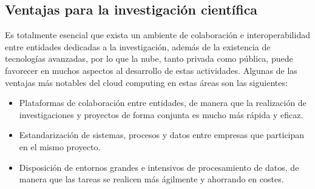\documentclass[a4paper, 12pt]{report}
\begin{document}
\subsection{Ventajas para la investigaci\'on cient\'ifica}
\begin{justify}
Es totalmente esencial que exista un ambiente de colaboraci\'on e interoperabilidad entre entidades dedicadas a la investigaci\'on, adem\'as de la existencia de tecnolog\'ias avanzadas, por lo que la nube, tanto privada como p\'ublica, puede favorecer en muchos aspectos al desarrollo de estas actividades.
Algunas de las ventajas m\'as notables del cloud computing en estas \'areas son las siguientes:
				\begin{itemize}
						\item{}Plataformas de colaboraci\'on entre entidades, de manera que la realizaci\'on de investigaciones y proyectos de forma conjunta es mucho m\'as r\'apida y eficaz.
						\item{}Estandarizaci\'on de sistemas, procesos y datos entre empresas que participan
en el mismo proyecto.
						\item{}Disposici\'on de entornos grandes e intensivos de procesamiento de datos, de manera que las tareas se realicen m\'as ágilmente y ahorrando en costes.
				\end{itemize}
\end{justify}
\newpage
\end{document}

